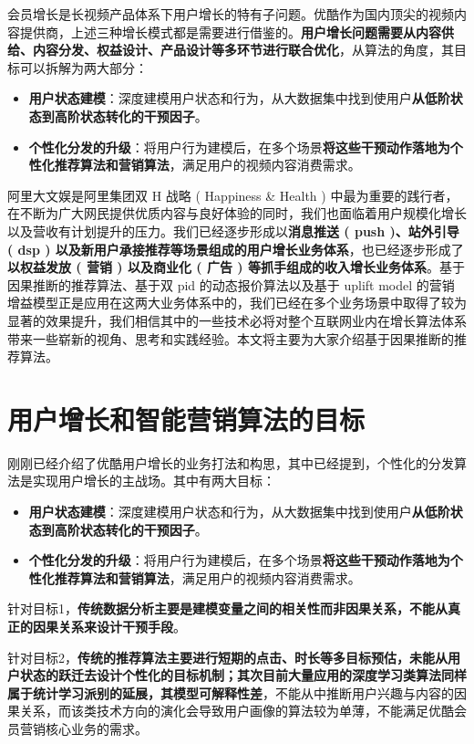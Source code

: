 \documentclass[12pt]{article}
\begin{document}
会员增长是长视频产品体系下用户增长的特有子问题。优酷作为国内顶尖的视频内容提供商，上述三种增长模式都是需要进行借鉴的。\textbf{用户增长问题需要从内容供给、内容分发、权益设计、产品设计等多环节进行联合优化}，从算法的角度，其目标可以拆解为两大部分：
\begin{itemize}
\setlength{\itemsep}{0pt}
\setlength{\parsep}{0pt}
\setlength{\parskip}{0pt}
    \item \textbf{用户状态建模}：深度建模用户状态和行为，从大数据集中找到使用户\textbf{从低阶状态到高阶状态转化的干预因子}。
    \item \textbf{个性化分发的升级}：将用户行为建模后，在多个场景\textbf{将这些干预动作落地为个性化推荐算法和营销算法}，满足用户的视频内容消费需求。
\end{itemize}

阿里大文娱是阿里集团双 H 战略 ( Happiness \& Health ) 中最为重要的践行者，在不断为广大网民提供优质内容与良好体验的同时，我们也面临着用户规模化增长以及营收有计划提升的压力。我们已经逐步形成以\textbf{消息推送 ( push )、站外引导 ( dsp ) 以及新用户承接推荐等场景组成的用户增长业务体系}，也已经逐步形成了\textbf{以权益发放 ( 营销 ) 以及商业化 ( 广告 ) 等抓手组成的收入增长业务体系}。基于因果推断的推荐算法、基于双 pid 的动态报价算法以及基于 uplift model 的营销增益模型正是应用在这两大业务体系中的，我们已经在多个业务场景中取得了较为显著的效果提升，我们相信其中的一些技术必将对整个互联网业内在增长算法体系带来一些崭新的视角、思考和实践经验。本文将主要为大家介绍基于因果推断的推荐算法。

\section{用户增长和智能营销算法的目标}
刚刚已经介绍了优酷用户增长的业务打法和构思，其中已经提到，个性化的分发算法是实现用户增长的主战场。其中有两大目标：
\begin{itemize}
\setlength{\itemsep}{0pt}
\setlength{\parsep}{0pt}
\setlength{\parskip}{0pt}
    \item \textbf{用户状态建模}：深度建模用户状态和行为，从大数据集中找到使用户\textbf{从低阶状态到高阶状态转化的干预因子}。
    \item \textbf{个性化分发的升级}：将用户行为建模后，在多个场景\textbf{将这些干预动作落地为个性化推荐算法和营销算法}，满足用户的视频内容消费需求。
\end{itemize}

针对目标1，\textbf{传统数据分析主要是建模变量之间的相关性而非因果关系，不能从真正的因果关系来设计干预手段}。

针对目标2，\textbf{传统的推荐算法主要进行短期的点击、时长等多目标预估，未能从用户状态的跃迁去设计个性化的目标机制；其次目前大量应用的深度学习类算法同样属于统计学习派别的延展，其模型可解释性差}，不能从中推断用户兴趣与内容的因果关系，而该类技术方向的演化会导致用户画像的算法较为单薄，不能满足优酷会员营销核心业务的需求。
\end{document}
